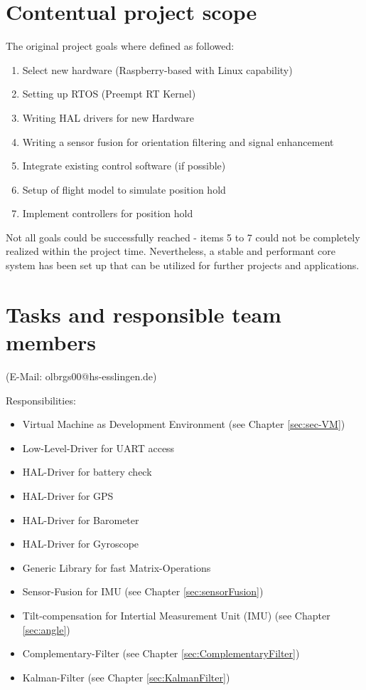 \section{Contentual project scope}
\label{sec:projGoals:projPlan:cententual}
The original project goals where defined as followed:
\begin{enumerate}
	\item Select new hardware (Raspberry-based with Linux capability) 
	\item Setting up RTOS (Preempt RT Kernel)
	\item Writing HAL drivers for new Hardware
	\item Writing a sensor fusion for orientation filtering and signal enhancement
	\item Integrate existing control software (if possible)
	\item Setup of flight model to simulate position hold
	\item Implement controllers for position hold
\end{enumerate}

Not all goals could be successfully reached - items 5 to 7 could not be completely realized within the project time. Nevertheless, a stable and performant core system has been set up that can be utilized for further projects and applications.

\section{Tasks and responsible team members}
\label{sec:projGoals:tasksAndMembers}

 (E-Mail: olbrgs00@hs-esslingen.de)

Responsibilities:
\begin{itemize}
	\item Virtual Machine as Development Environment (see Chapter \ref{sec:sec-VM})
	\item Low-Level-Driver for UART access
	\item HAL-Driver for battery check
	\item HAL-Driver for GPS
	\item HAL-Driver for Barometer
	\item HAL-Driver for Gyroscope
	\item Generic Library for fast Matrix-Operations
	\item Sensor-Fusion for IMU (see Chapter \ref{sec:sensorFusion})
	\item Tilt-compensation for Intertial Measurement Unit (IMU) (see Chapter \ref{sec:angle})
	\item Complementary-Filter (see Chapter \ref{sec:ComplementaryFilter})
	\item Kalman-Filter (see Chapter \ref{sec:KalmanFilter})
\end{itemize}

